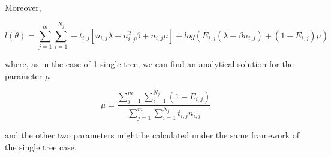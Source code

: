 \documentclass[]{article}
\begin{document}
Moreover, 

$$ l(\theta) = \displaystyle\sum_{j=1}^m \displaystyle\sum_{i=1}^{N_j} -t_{i,j}[n_{i,j}\lambda -n_{i,j}^2 \beta + n_{i,j} \mu] + log(E_{i,j}(\lambda-\beta n_{i,j})+(1-E_{i,j})\mu) $$ 

where, as in the case of 1 single tree, we can find an analytical solution for the parameter $\mu$

$$ \mu = \frac{\displaystyle\sum_{j=1}^m \displaystyle\sum_{i=1}^{N_j}(1-E_{i,j})}{\displaystyle\sum_{j=1}^m \displaystyle\sum_{i=1}^{N_j} t_{i,j}n_{i,j}} $$

and the other two parameters might be calculated under the same framework of the single tree case. 
\end{document}
